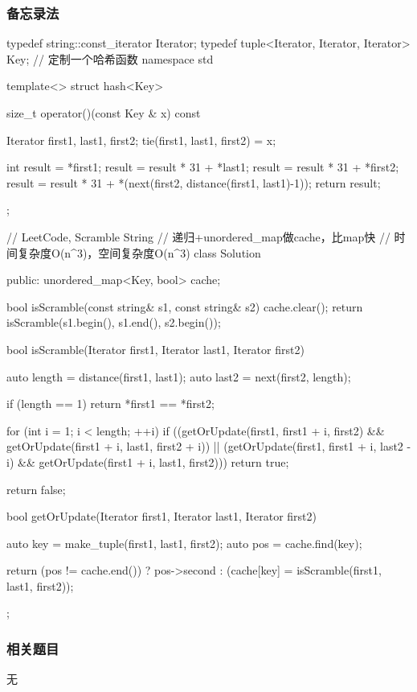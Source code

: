 \subsubsection{备忘录法}
\begin{Code}
typedef string::const_iterator Iterator;
typedef tuple<Iterator, Iterator, Iterator> Key;
// 定制一个哈希函数
namespace std {
template<> struct hash<Key> {
    size_t operator()(const Key & x) const {
        Iterator first1, last1, first2;
        tie(first1, last1, first2) = x;

        int result = *first1;
        result = result * 31 + *last1;
        result = result * 31 + *first2;
        result = result * 31 + *(next(first2, distance(first1, last1)-1));
        return result;
    }
};
}

// LeetCode, Scramble String
// 递归+unordered_map做cache，比map快
// 时间复杂度O(n^3)，空间复杂度O(n^3)
class Solution {
public:
    unordered_map<Key, bool> cache;

    bool isScramble(const string& s1, const string& s2) {
        cache.clear();
        return isScramble(s1.begin(), s1.end(), s2.begin());
    }

    bool isScramble(Iterator first1, Iterator last1, Iterator first2) {
        auto length = distance(first1, last1);
        auto last2 = next(first2, length);

        if (length == 1)
            return *first1 == *first2;

        for (int i = 1; i < length; ++i)
            if ((getOrUpdate(first1, first1 + i, first2)
                    && getOrUpdate(first1 + i, last1, first2 + i))
                    || (getOrUpdate(first1, first1 + i, last2 - i)
                            && getOrUpdate(first1 + i, last1, first2)))
                return true;

        return false;
    }

    bool getOrUpdate(Iterator first1, Iterator last1, Iterator first2) {
        auto key = make_tuple(first1, last1, first2);
        auto pos = cache.find(key);

        return (pos != cache.end()) ?
                pos->second : (cache[key] = isScramble(first1, last1, first2));
    }
};
\end{Code}


\subsubsection{相关题目}
\begindot
\item 无
\myenddot


